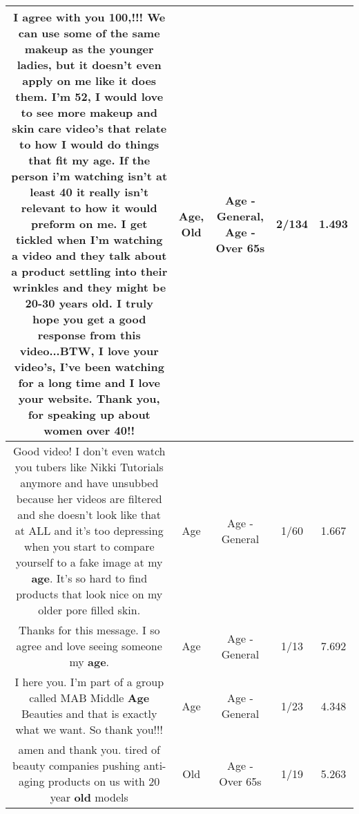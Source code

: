 \documentclass[11pt]{article}
\newlength\mylength
\begin{document}
\begin{center}
\begin{longtable}{|C{.65\mylength}|C{.30\mylength}|C{.12\mylength}|C{.12\mylength}|C{.12\mylength}|}
  \small I agree with you 100,!!!  We can use some of the same makeup as the younger ladies, but it doesn't even apply on me like it does them.  I'm 52, I would love to see more makeup and skin care video's that relate to how I would do things that fit my \textbf{age}.  If the person i'm watching isn't at least 40 it really isn't relevant to how it would preform on me.  I get tickled when I'm watching a video and they talk about a product settling into their wrinkles and they might be 20-30 years \textbf{old}.  I truly hope you get a good response from this video...BTW, I love your video's, I've been watching for a long time and I love your website.  Thank you, for speaking up about women over 40!!\normalsize   & Age, Old & Age - General, Age - Over 65s & 2/134 & 1.493 \\  \hline
  \small Good video! I don't even watch you tubers like Nikki Tutorials anymore and have unsubbed because her videos are filtered and she doesn't look like that at ALL and it's too depressing when you start to compare yourself to a fake image at my \textbf{age}. It's so hard to find products that look nice on my older pore filled skin.\normalsize   & Age & Age - General & 1/60 & 1.667 \\  \hline
  \small Thanks for this message. I so agree and love seeing someone my \textbf{age}.\normalsize   & Age & Age - General & 1/13 & 7.692 \\  \hline
  \small I here you. I'm part of a group called MAB Middle \textbf{Age} Beauties and that is exactly what we want. So thank you!!!\normalsize   & Age & Age - General & 1/23 & 4.348 \\  \hline
  \small amen and thank you. tired of beauty companies pushing anti- aging products on us with  20 year \textbf{old} models\normalsize   & Old & Age - Over 65s & 1/19 & 5.263 \\  \hline
  
\end{longtable}
\end{center}
\end{document}
